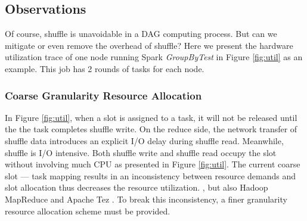 \subsection{Observations} \label{observation}
Of course, shuffle is unavoidable in a DAG computing process. 
But can we mitigate or even remove the overhead of shuffle? 
Here we present the hardware utilization trace of one node running Spark \textit{GroupByTest} in Figure \ref{fig:util} as an example. 
This job has 2 rounds of tasks for each node.
\ifrevision
\reversemarginpar
{}
\fi
\subsubsection{Coarse Granularity Resource Allocation}
In Figure \ref{fig:util}, when a slot is assigned to a task, it will not be released until the the task completes shuffle write. 
On the reduce side, the network transfer of shuffle data introduces an explicit I/O delay during shuffle read. 
Meanwhile, shuffle is I/O intensive. 
Both shuffle write and shuffle read occupy the slot without involving much CPU as presented in Figure \ref{fig:util}. 
The current coarse slot --- task mapping results in an inconsistency between resource demands and slot allocation thus decreases the resource utilization. 
 \cite{apachespark}, but also Hadoop MapReduce \cite{hadoop} and Apache Tez \cite{tez}. 
To break this inconsistency, a finer granularity resource allocation scheme must be provided.


